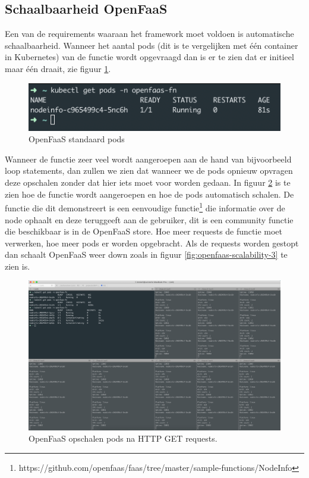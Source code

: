 \subsection{Schaalbaarheid OpenFaaS}
Een van de requirements waaraan het framework moet voldoen is automatische schaalbaarheid. Wanneer het aantal pods (dit is te vergelijken met één container in Kubernetes) van de functie wordt opgevraagd dan is er te zien dat er initieel maar één draait, zie figuur \ref{fig:openfaas-scalability-1}.
\begin{figure}
    \includegraphics[width=1\textwidth]{img/openfaas-scalability-1.png}
    \caption{OpenFaaS standaard pods}
    \label{fig:openfaas-scalability-1}  
\end{figure}

Wanneer de functie zeer veel wordt aangeroepen aan de hand van bijvoorbeeld loop statements, dan zullen we zien dat wanneer we de pods opnieuw opvragen deze opschalen zonder dat hier iets moet voor worden gedaan. In figuur \ref{fig:openfaas-scalability-2} is te zien hoe de functie wordt aangeroepen en hoe de pods automatisch schalen. De functie die dit demonstreert is een eenvoudige functie\footnote{https://github.com/openfaas/faas/tree/master/sample-functions/NodeInfo} die informatie over de node ophaalt en deze teruggeeft aan de gebruiker, dit is een community functie die beschikbaar is in de OpenFaaS store. Hoe meer requests de functie moet verwerken, hoe meer pods er worden opgebracht. Als de requests worden gestopt dan schaalt OpenFaaS weer down zoals in figuur \ref{fig:openfaas-scalability-3} te zien is.

\begin{figure}
    \includegraphics[width=1\textwidth]{img/openfaas-scalability-2.png}
    \caption{OpenFaaS opschalen pods na HTTP GET requests.}
    \label{fig:openfaas-scalability-2}  
\end{figure}

